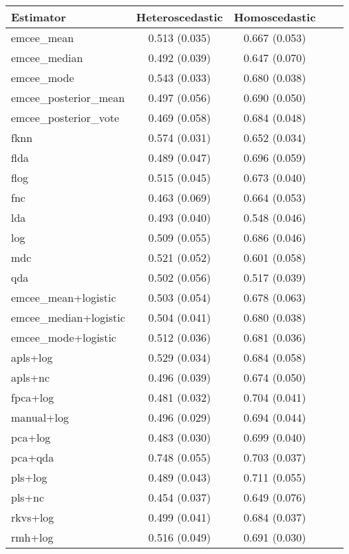 \begin{table}[htbp!]
  \centering
  \begin{tabular}{lcccc}
\toprule
            \textbf{Estimator} &            \textbf{Heteroscedastic} &           \textbf{Homoscedastic}\\
\midrule

          emcee\_mean &   0.513 (0.035) & 0.667 (0.053) \\
        emcee\_median &   0.492 (0.039) & 0.647 (0.070) \\
          emcee\_mode &   0.543 (0.033) & 0.680 (0.038) \\
emcee\_posterior\_mean &   0.497 (0.056) & 0.690 (0.050) \\
emcee\_posterior\_vote &   0.469 (0.058) & 0.684 (0.048) \\
                fknn &   0.574 (0.031) & 0.652 (0.034) \\
                flda &   0.489 (0.047) & 0.696 (0.059) \\
                flog &   0.515 (0.045) & 0.673 (0.040) \\
                 fnc &   0.463 (0.069) & 0.664 (0.053) \\
                 lda &   0.493 (0.040) & 0.548 (0.046) \\
                 log &   0.509 (0.055) & 0.686 (0.046) \\
                 mdc &   0.521 (0.052) & 0.601 (0.058) \\
                 qda &   0.502 (0.056) & 0.517 (0.039) \\

\bottomrule
\toprule

  emcee\_mean+logistic &   0.503 (0.054) & 0.678 (0.063) \\
emcee\_median+logistic &   0.504 (0.041) & 0.680 (0.038) \\
  emcee\_mode+logistic &   0.512 (0.036) & 0.681 (0.036) \\
               apls+log &   0.529 (0.034) & 0.684 (0.058) \\
              apls+nc &   0.496 (0.039) & 0.674 (0.050) \\
             fpca+log &   0.481 (0.032) & 0.704 (0.041) \\
           manual+log &   0.496 (0.029) & 0.694 (0.044) \\
              pca+log &   0.483 (0.030) & 0.699 (0.040) \\
              pca+qda &   0.748 (0.055) & 0.703 (0.037) \\
              pls+log &   0.489 (0.043) & 0.711 (0.055) \\
               pls+nc &   0.454 (0.037) & 0.649 (0.076) \\
             rkvs+log &   0.499 (0.041) & 0.684 (0.037) \\
              rmh+log &   0.516 (0.049) & 0.691 (0.030) \\


\end{tabular}
\end{table}
